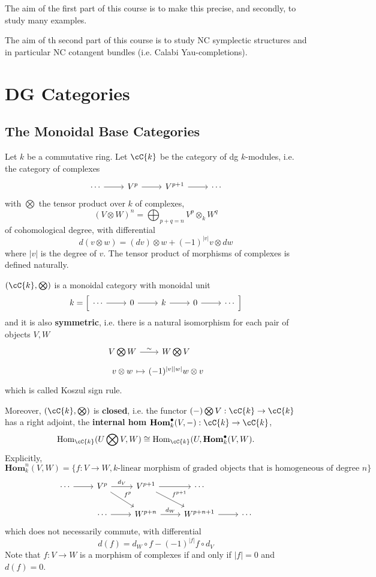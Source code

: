 The aim of the first part of this course is to make this precise, and secondly, to study many examples. 

The aim of th second part of this course is to study NC symplectic structures and in particular NC cotangent bundles (i.e. Calabi Yau-completions). 


\section{DG Categories}

\subsection{The Monoidal Base Categories} 

Let $ k $ be a commutative ring. Let $ \cC{k} $ be the category of dg $ k $-modules, i.e. the category of complexes 
\[\begin{tikzcd}
\cdots \ar[r] & V^{p} \ar[r] & V^{p+1} \ar[r] & \cdots 
\end{tikzcd}\]
with $ \bigotimes $ the tensor product over $ k $ of complexes, 
\[ (V\otimes W)^{n} = \bigoplus_{p+q=n} V^{p}\otimes_{k}W^{q} \]
of cohomological degree, with differential 
\[ d(v\otimes w) = (dv)\otimes w + (-1)^{|v|}v\otimes dw \]
where $ |v| $ is the degree of $ v $. 
The tensor product of morphisms of complexes is defined naturally. 

$ (\cC{k}, \bigotimes) $ is a monoidal category with monoidal unit 
\[ k = \left[ \begin{tikzcd}
\cdots \ar[r] & 0 \ar[r] & k \ar[r] & 0 \ar[r] & \cdots
\end{tikzcd} \right] \]
and it is also {\bf symmetric}, i.e. there is a natural isomorphism for each pair of objects $ V,W $
\[ \begin{tikzcd}[sep=tiny]
V\bigotimes W \ar[r,"\sim"] & W\bigotimes V \\
v\otimes w \ar[r,mapsto] & (-1)^{|v| |w|}w\otimes v
\end{tikzcd} \]
which is called Koszul sign rule. 

Moreover, $ (\cC{k}, \bigotimes) $ is {\bf closed}, i.e. the functor 
$ (-)\bigotimes V: \cC{k} \to \cC{k} $ 
has a right adjoint, the {\bf internal hom} 
$ \iHom_{k}(V,-): \cC{k} \to \cC{k} $, 
\[ \Hom_{\cC{k}}(U\bigotimes V,W) \cong \Hom_{\cC{k}}(U, \iHom_{k}(V,W). \]
Explicitly, 
\[ \mathbf{Hom}^{n}_{k}(V,W) = \{ f:V \to W, k \text{-linear morphism of graded objects that is homogeneous of degree } n \} \]
\[\begin{tikzcd}
\cdots \ar[r] & V^{p}\ar[dr,"f^{p}"] \ar[r,"d_{V}"] & V^{p+1} \ar[r] \ar[dr,"f^{p+1}"] & \cdots & \\
& \cdots \ar[r] & W^{p+n} \ar[r,"d_{W}"] & W^{p+n+1} \ar[r] & \cdots
\end{tikzcd}\]
which does not necessarily commute, with differential 
\[ d(f) = d_{W}\circ f - (-1)^{|f|}f\circ d_{V} \]
Note that $ f: V \to W $ is a morphism of complexes if and only if $ |f| = 0 $ and $ d(f) = 0 $. 

